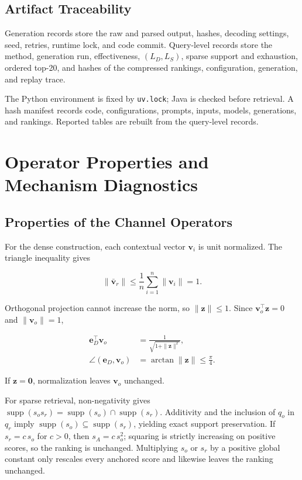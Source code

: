 \subsection{Artifact Traceability}

\label{artifact-traceability}

Generation records store the raw and parsed output, hashes, decoding settings, seed, retries, runtime lock, and code commit. Query-level records store the method, generation run, effectiveness, \((L_D,L_S)\), sparse support and exhaustion, ordered top-20, and hashes of the compressed rankings, configuration, generation, and replay trace.

The Python environment is fixed by \texttt{uv.lock}; Java is checked before retrieval. A hash manifest records code, configurations, prompts, inputs, models, generations, and rankings. Reported tables are rebuilt from the query-level records.

\section{Operator Properties and Mechanism Diagnostics}

\label{sec:appendix-operators}

\subsection{Properties of the Channel Operators}

\label{properties-of-the-channel-operators}

For the dense construction, each contextual vector \(\mathbf v_i\) is unit normalized. The triangle inequality gives

\[\|\bar{\mathbf v}_r\|
\leq \frac{1}{n}\sum_{i=1}^{n}\|\mathbf v_i\|=1.\]

Orthogonal projection cannot increase the norm, so \(\|\mathbf z\|\leq 1\). Since \(\mathbf v_o^\top\mathbf z=0\) and \(\|\mathbf v_o\|=1\),

\[\begin{aligned}
\mathbf e_D^\top\mathbf v_o
&=\frac{1}{\sqrt{1+\|\mathbf z\|^2}},\\
\angle(\mathbf e_D,\mathbf v_o)
&=\arctan\|\mathbf z\|\leq\frac{\pi}{4}.
\end{aligned}\]

If \(\mathbf z=\mathbf 0\), normalization leaves \(\mathbf v_o\) unchanged.

For sparse retrieval, non-negativity gives \(\operatorname{supp}(s_os_r)=
\operatorname{supp}(s_o)\cap\operatorname{supp}(s_r)\). Additivity and the inclusion of \(q_o\) in \(q_r\) imply \(\operatorname{supp}(s_o)\subseteq\operatorname{supp}(s_r)\), yielding exact support preservation. If \(s_r=c\,s_o\) for \(c>0\), then \(s_A=c\,s_o^2\); squaring is strictly increasing on positive scores, so the ranking is unchanged. Multiplying \(s_o\) or \(s_r\) by a positive global constant only rescales every anchored score and likewise leaves the ranking unchanged.

